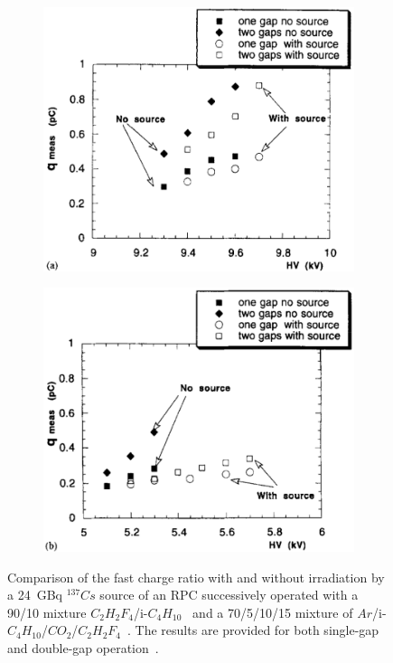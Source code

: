 	\begin{figure}[H]
		\begin{subfigure}{0.5\linewidth}
			\centering
			\includegraphics[width = \linewidth]{fig/chapt3/Freon-fast-charge-irrad.png}
			\caption{\label{fig:FreonArgonFastCharge:A}}
		\end{subfigure}
		\begin{subfigure}{0.5\linewidth}
			\centering
			\includegraphics[width = \linewidth]{fig/chapt3/Argon-fast-charge-irrad.png}
			\caption{\label{fig:FreonArgonFastCharge:B}}
		\end{subfigure}
		\caption{\label{fig:FreonArgonFastCharge} Comparison of the fast charge ratio with and without irradiation by a \SI{24}{GBq} $^{137}Cs$ source of an RPC successively operated with a 90/10 mixture $C_2H_2F_4$/i-$C_4H_{10}$~ and a 70/5/10/15 mixture of $Ar$/i-$C_4H_{10}$/$CO_2$/$C_2H_2F_4$~. The results are provided for both single-gap and double-gap operation~\cite{ABBRESCIA1997PERF}.}
	\end{figure}
	
